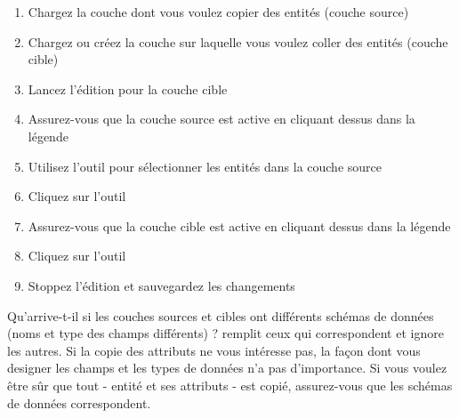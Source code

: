\begin{enumerate}
\item Chargez la couche dont vous voulez copier des entités (couche source)
\item Chargez ou créez la couche sur laquelle vous voulez coller des entités (couche cible)
\item Lancez l'édition pour la couche cible
\item Assurez-vous que la couche source est active en cliquant dessus dans la légende
\item Utilisez l'outil  pour sélectionner les entités dans la couche source
\item Cliquez sur l'outil 
\item Assurez-vous que la couche cible est active en cliquant dessus dans la légende
\item Cliquez sur l'outil 
\item Stoppez l'édition et sauvegardez les changements
\end{enumerate}

Qu'arrive-t-il si les couches sources et cibles ont différents schémas de données 
(noms et type des champs différents) ? \qg remplit ceux qui correspondent et 
ignore les autres. Si la copie des attributs ne vous intéresse pas, la façon 
dont vous designer les champs et les types de données n'a pas d'importance. Si 
vous voulez être sûr que tout - entité et ses attributs - est copié, assurez-vous 
que les schémas de données correspondent.

